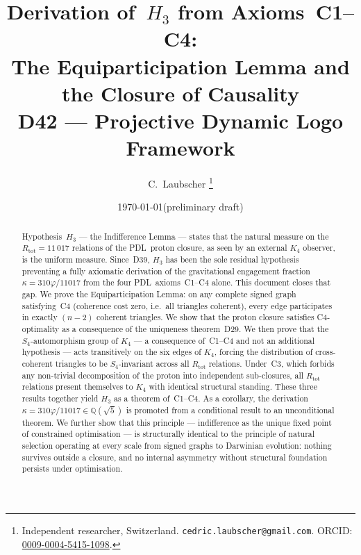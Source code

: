 \documentclass[11pt,a4paper]{article}
\theoremstyle{plain}
\theoremstyle{definition}
\theoremstyle{remark}
\newcommand{\PDL}{\textnormal{PDL}}
\newcommand{\Kfour}{K_4}
\newcommand{\Rtot}{R_{\mathrm{tot}}}
\newcommand{\vp}{\varphi}
\newcommand{\kap}{\kappa}
\begin{document}
\title{%
  Derivation of~$H_3$ from Axioms~C1--C4:\\
  The Equiparticipation Lemma and the Closure of Causality\\[4pt]
  \large\normalfont D42 --- Projective Dynamic Logo Framework%
}
\author{%
  C.~Laubscher%
  \thanks{Independent researcher, Switzerland.
    \texttt{cedric.laubscher@gmail.com}.
    ORCID: \href{https://orcid.org/0009-0004-5415-1098}{0009-0004-5415-1098}.}\\[4pt]
}
\date{\small\today\quad(preliminary draft)}
\maketitle

\begin{abstract}
Hypothesis~$H_3$ --- the Indifference Lemma --- states that the natural measure on the $\Rtot = 11\,017$ relations of the \PDL\ proton closure, as seen by an external $\Kfour$ observer, is the uniform measure. Since~D39, $H_3$ has been the sole residual hypothesis preventing a fully axiomatic derivation of the gravitational engagement fraction $\kap = 310\vp/11017$ from the four \PDL\ axioms~C1--C4 alone. This document closes that gap. We prove the Equiparticipation Lemma: on any complete signed graph satisfying~C4 (coherence cost zero, i.e.\ all triangles coherent), every edge participates in exactly $(n-2)$ coherent triangles. We show that the proton closure satisfies C4-optimality as a consequence of the uniqueness theorem~D29. We then prove that the $S_4$-automorphism group of $\Kfour$ --- a consequence of~C1--C4 and not an additional hypothesis --- acts transitively on the six edges of $\Kfour$, forcing the distribution of cross-coherent triangles to be $S_4$-invariant across all $\Rtot$ relations. Under~C3, which forbids any non-trivial decomposition of the proton into independent sub-closures, all $\Rtot$ relations present themselves to $\Kfour$ with identical structural standing. These three results together yield $H_3$ as a theorem of~C1--C4. As a corollary, the derivation $\kap = 310\vp/11017 \in \mathbb{Q}(\sqrt{5})$ is promoted from a conditional result to an unconditional theorem. We further show that this principle --- indifference as the unique fixed point of constrained optimisation --- is structurally identical to the principle of natural selection operating at every scale from signed graphs to Darwinian evolution: nothing survives outside a closure, and no internal asymmetry without structural foundation persists under optimisation.
\end{abstract}
\end{document}
